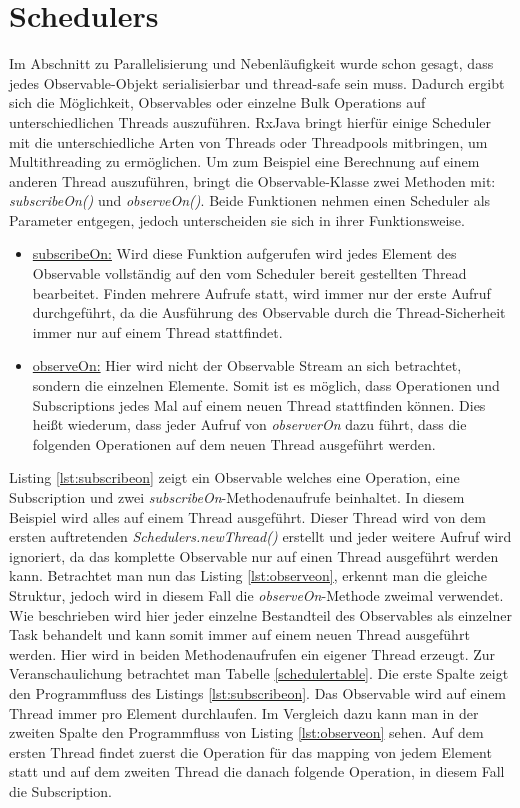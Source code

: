 \section{Schedulers}
Im Abschnitt zu Parallelisierung und Nebenläufigkeit wurde schon gesagt, dass jedes Observable-Objekt serialisierbar und thread-safe sein muss. Dadurch ergibt sich die Möglichkeit, Observables oder einzelne Bulk Operations auf unterschiedlichen Threads auszuführen. RxJava bringt hierfür einige Scheduler mit die unterschiedliche Arten von Threads oder Threadpools mitbringen, um Multithreading zu ermöglichen. Um zum Beispiel eine Berechnung auf einem anderen Thread auszuführen, bringt die Observable-Klasse zwei Methoden mit: \textit{subscribeOn()} und \textit{observeOn()}. Beide Funktionen nehmen einen Scheduler als Parameter entgegen, jedoch unterscheiden sie sich in ihrer Funktionsweise. 
\begin{itemize}
\item \underline{subscribeOn:} Wird diese Funktion aufgerufen wird jedes Element des Observable vollständig auf den vom Scheduler bereit gestellten Thread bearbeitet. Finden mehrere Aufrufe statt, wird immer nur der erste Aufruf durchgeführt, da die Ausführung des Observable durch die Thread-Sicherheit immer nur auf einem Thread stattfindet. 
\item \underline{observeOn:} Hier wird nicht der Observable Stream an sich betrachtet, sondern die einzelnen Elemente. Somit ist es möglich, dass Operationen und Subscriptions jedes Mal auf einem neuen Thread stattfinden können. Dies heißt wiederum, dass jeder Aufruf von \textit{observerOn} dazu führt, dass die folgenden Operationen auf dem neuen Thread ausgeführt werden.
\end{itemize}

Listing \ref{lst:subscribeon} zeigt ein Observable welches eine Operation, eine Subscription und zwei \textit{subscribeOn}-Methodenaufrufe beinhaltet. In diesem Beispiel wird alles auf einem Thread ausgeführt. Dieser Thread wird von dem ersten auftretenden \textit{Schedulers.newThread()} erstellt und jeder weitere Aufruf wird ignoriert, da das komplette Observable nur auf einen Thread ausgeführt werden kann. Betrachtet man nun das Listing \ref{lst:observeon}, erkennt man die gleiche Struktur, jedoch wird in diesem Fall die \textit{observeOn}-Methode zweimal verwendet. Wie beschrieben wird hier jeder einzelne Bestandteil des Observables als einzelner Task behandelt und kann somit immer auf einem neuen Thread ausgeführt werden. Hier wird in beiden Methodenaufrufen ein eigener Thread erzeugt. Zur Veranschaulichung betrachtet man Tabelle \ref{schedulertable}. Die erste Spalte zeigt den Programmfluss des Listings \ref{lst:subscribeon}. Das Observable wird auf einem Thread immer pro Element durchlaufen. Im Vergleich dazu kann man in der zweiten Spalte den Programmfluss von Listing \ref{lst:observeon} sehen. Auf dem ersten Thread findet zuerst die Operation für das mapping von jedem Element statt und auf dem zweiten Thread die danach folgende Operation, in diesem Fall die Subscription.
